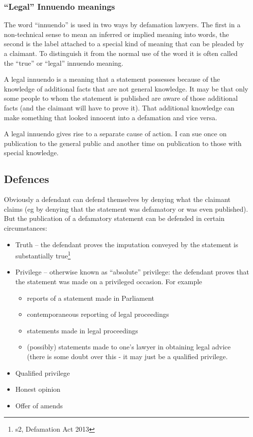 \documentclass[]{article}
\begin{document}
\subsubsection{\texorpdfstring{``Legal'' Innuendo
meanings}{Legal Innuendo meanings}}

The word ``innuendo'' is used in two ways by defamation lawyers. The
first in a non-technical sense to mean an inferred or implied meaning
into words, the second is the label attached to a special kind of
meaning that can be pleaded by a claimant. To distinguish it from the
normal use of the word it is often called the ``true'' or ``legal''
innuendo meaning.

A legal innuendo is a meaning that a statement possesses because of the
knowledge of additional facts that are not general knowledge. It may be
that only some people to whom the statement is published are aware of
those additional facts (and the claimant will have to prove it). That
additional knowledge can make something that looked innocent into a
defamation and vice versa.

A legal innuendo gives rise to a separate cause of action. I can sue
once on publication to the general public and another time on
publication to those with special knowledge.

\subsection{Defences}

Obviously a defendant can defend themselves by denying what the claimant
claims (eg by denying that the statement was defamatory or was even
published). But the publication of a defamatory statement can be defended in certain circumstances:

\begin{itemize}
\item
  Truth -- the defendant proves the imputation conveyed by the statement is substantially true\footnote{s2, Defamation Act 2013}
\item
  Privilege -- otherwise known as ``absolute'' privilege: the defendant
  proves that the statement was made on a privileged occasion. For
  example

  \begin{itemize}
  \item
    reports of a statement made in Parliament
  \item
    contemporaneous reporting of legal proceedings
  \item
    statements made in legal proceedings
  \item
    (possibly) statements made to one's lawyer in obtaining legal advice
    (there is some doubt over this - it may just be a qualified
    privilege.
  \end{itemize}
\item
  Qualified privilege
\item Honest opinion
\item
  Offer of amends
\end{itemize}
\end{document}
